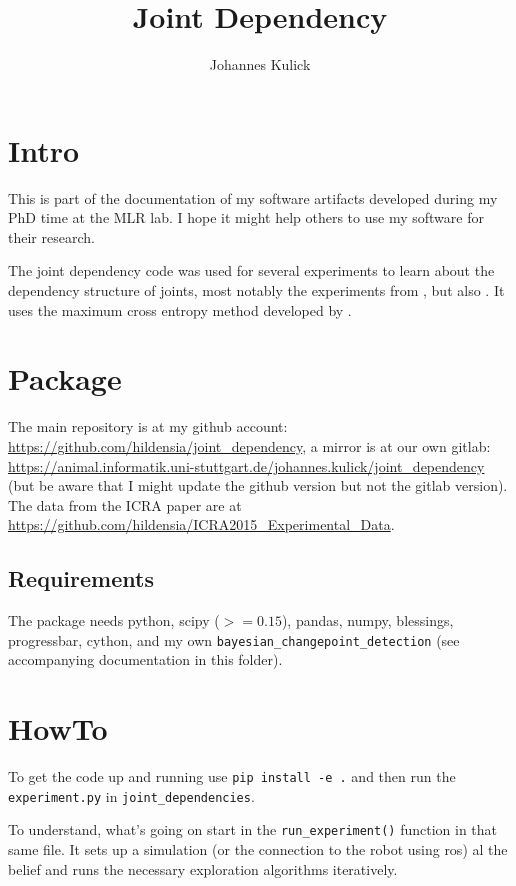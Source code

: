 \documentclass{article}
\author{Johannes Kulick}
\title{Joint Dependency}
\begin{document}
\maketitle

\section{Intro}
This is part of the documentation of my software artifacts developed during my
PhD time at the MLR lab. I hope it might help others to use my software for
their research.

The joint dependency code was used for several experiments to learn about the
dependency structure of joints, most notably the experiments from
\textcite{kulick_active_2015}, but also \textcite{kulick_robots_2015,
bernstein_opening_2017}. It uses the maximum cross entropy method developed by
\textcite{kulick_advantage_2015}.

\section{Package}

The main repository is at my github account:
\url{https://github.com/hildensia/joint_dependency}, a mirror is
  at our own gitlab:
  \url{https://animal.informatik.uni-stuttgart.de/johannes.kulick/joint_dependency}
  (but be aware that I might update the github version but not the gitlab
  version). The data from the ICRA paper \parencite{kulick_active_2015} are at
  \url{https://github.com/hildensia/ICRA2015_Experimental_Data}.

\subsection{Requirements}
The package needs python, scipy ($>=0.15$), pandas, numpy, blessings, progressbar,
cython, and my own \verb+bayesian_changepoint_detection+ (see accompanying
documentation in this folder).

\section{HowTo}
To get the code up and running use \verb+pip install -e .+ and then run the
\verb+experiment.py+ in \verb+joint_dependencies+.

To understand, what's going on start in the \verb+run_experiment()+ function in that
same file. It sets up a simulation (or the connection to the robot using ros) al
the belief and runs the necessary exploration algorithms iteratively.
\end{document}
